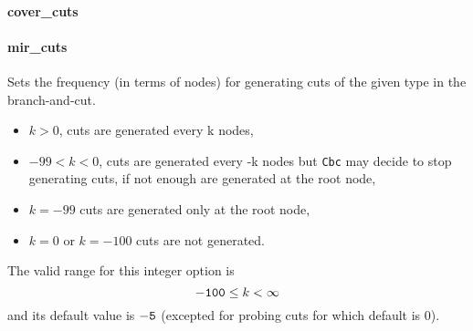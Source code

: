 \paragraph{cover\_cuts}
\paragraph{mir\_cuts}
Sets the frequency (in terms of nodes) for generating cuts of
the given type in the branch-and-cut.
\begin{itemize}
\item $k > 0$, cuts are generated every k nodes,
\item $-99 < k < 0$,  cuts are generated every -k nodes but
{\tt Cbc} may decide to stop generating cuts, if not
enough are generated at the root node,
\item$k = -99$ cuts are generated only at the root node,
\item $k = 0$ or $k = -100$ cuts are not generated.
\end{itemize}
 The valid range for this integer option is
$${\tt -100} \le k <  \infty$$
and its default value is ${\tt -5}$ (excepted for probing
cuts for which default is 0).
